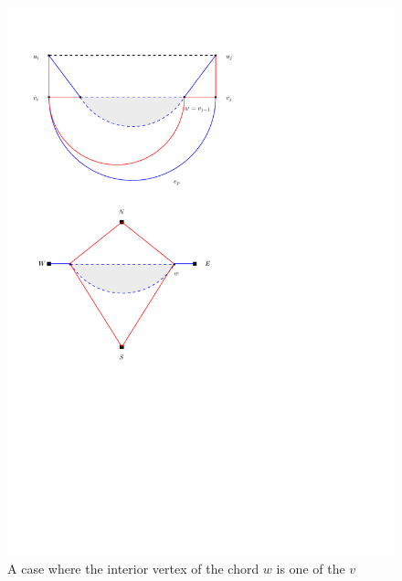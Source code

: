 \documentclass[a4paper]{article}
\theoremstyle{definition}
\begin{document}
\begin{figure}
\includegraphics[scale=1]{img/chordWithInnerChordColoring}
\caption{A case where the interior vertex of the chord $w$ is one of the $v$}
\end{figure}
\end{document}
